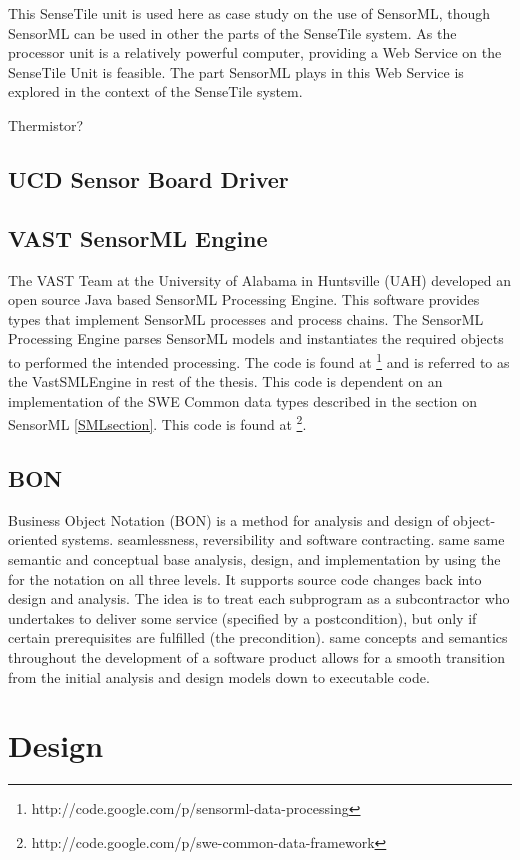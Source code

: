 \documentclass[]{final_report}
\begin{document}
This SenseTile unit is used here as case study on the use of SensorML, though SensorML can be used in other the parts of the SenseTile system. As the processor unit is  a relatively powerful computer, providing a Web Service on the SenseTile Unit is feasible. The part SensorML plays in this Web Service is explored in the context of the SenseTile system.

Thermistor?

\section{UCD Sensor Board Driver}\label{SensorBoardDriverSec}


\section{VAST SensorML Engine}\label{VastSensorMLEngineSec}
The VAST Team at the University of Alabama in Huntsville (UAH)  developed an open source Java based SensorML Processing Engine. This software provides types that implement SensorML processes and process  chains. The SensorML Processing Engine parses SensorML models and instantiates the required objects to performed the intended processing. The code is found at \footnote{http://code.google.com/p/sensorml-data-processing} and is referred to as the VastSMLEngine in rest of the thesis. This code is dependent on an implementation of the SWE Common data types described in the section on SensorML \ref{SMLsection}. This code is found at \footnote{http://code.google.com/p/swe-common-data-framework}.


\section{BON}
Business Object Notation (BON) is a method for analysis and design of
object-oriented systems.
seamlessness, reversibility and software contracting.
same same semantic and conceptual base  analysis, design, and implementation by using the
 for the notation on all three levels. It supports source code changes back into design and analysis.
The idea is to treat each subprogram as a subcontractor
who undertakes to deliver some service (specified by a postcondition), but only if
certain prerequisites are fulfilled (the precondition).
same concepts and semantics throughout the development of a
software product allows for a smooth transition from the initial analysis and design models
down to executable code.
\cite{BONref}
\chapter{Design}
\end{document}
